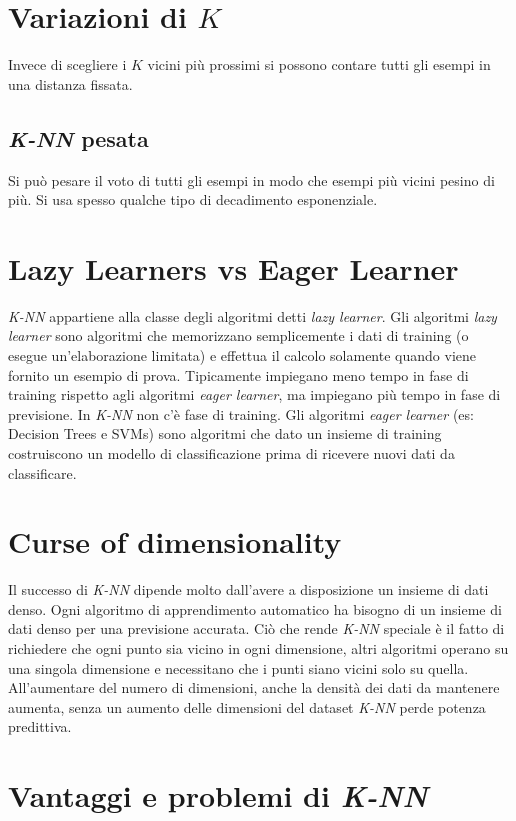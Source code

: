\section{Variazioni di $K$}
Invece di scegliere i $K$ vicini pi\`u prossimi si possono contare tutti gli esempi in una distanza fissata.

\subsection{\emph{K-NN} pesata}
Si pu\`o pesare il voto di tutti gli esempi in modo che esempi pi\`u vicini pesino di pi\`u.
Si usa spesso qualche tipo di decadimento esponenziale.

\section{Lazy Learners vs Eager Learner}
\emph{K-NN} appartiene alla classe degli algoritmi detti \emph{lazy learner}.
Gli algoritmi \emph{lazy learner} sono algoritmi che memorizzano semplicemente i dati di training (o esegue un'elaborazione limitata) e effettua il calcolo solamente quando viene fornito un esempio di prova. Tipicamente impiegano meno tempo in fase di training rispetto agli algoritmi \emph{eager learner}, ma impiegano più tempo in fase di previsione. In \emph{K-NN} non c'\`e fase di training.
Gli algoritmi \emph{eager learner} (es: Decision Trees e SVMs) sono algoritmi che dato un insieme di training costruiscono un modello di classificazione prima di ricevere nuovi dati da classificare.


\section{Curse of dimensionality}

Il successo di \emph{K-NN} dipende molto dall'avere a disposizione un insieme di dati denso. Ogni algoritmo di apprendimento automatico ha bisogno di un insieme di dati denso per una previsione accurata. Ci\`o che rende \emph{K-NN} speciale è il fatto di richiedere che ogni punto sia vicino in ogni dimensione, altri algoritmi operano su una singola dimensione e necessitano che i punti siano vicini solo su quella.
All'aumentare del numero di dimensioni, anche la densit\`a dei dati da mantenere aumenta, senza un aumento delle dimensioni del dataset \emph{K-NN} perde potenza predittiva.


\section{Vantaggi e problemi di \emph{K-NN}}

